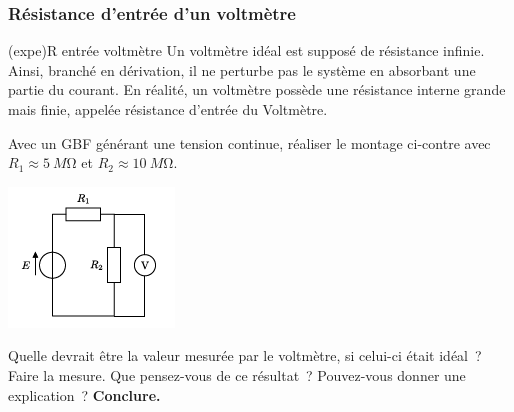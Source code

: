 \documentclass[../main/main.tex]{subfiles}
\begin{document}
\subsubsection{Résistance d'entrée d'un voltmètre}

\begin{tcb}[sidebyside, righthand ratio=.3](expe){R entrée voltmètre}
	Un voltmètre idéal est supposé de résistance infinie. Ainsi, branché
	en dérivation, il ne perturbe pas le système en absorbant une partie du
	courant. En réalité, un voltmètre possède une résistance interne grande
	mais finie, appelée résistance d'entrée du Voltmètre.

	Avec un GBF générant une tension continue, réaliser le montage
	ci-contre avec $R_1 \approx \SI{5}{M\ohm}$ et $R_2 \approx
		\SI{10}{M\ohm}$.
	\tcblower
	\begin{center}
		\includegraphics[width=\linewidth]{voltreel}
	\end{center}
\end{tcb}
\begin{enumerate}
	\clitem[3] Quelle devrait être la valeur mesurée par le voltmètre, si
	celui-ci était idéal~?
	\sqitem[7] Faire la mesure. Que pensez-vous de ce résultat~? Pouvez-vous
	donner une explication~?
	\sqitem[8] \textbf{Conclure.}
\end{enumerate}
\end{document}
